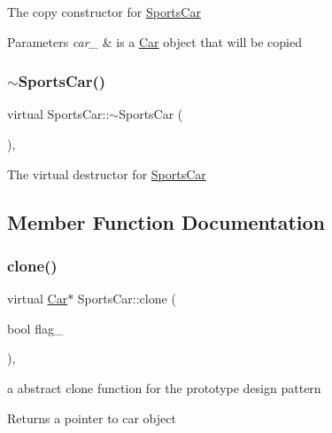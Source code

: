 The copy constructor for \mbox{\hyperlink{class_sports_car}{Sports\+Car}} 
\begin{DoxyParams}{Parameters}
{\em car\+\_\+} & is a \mbox{\hyperlink{class_car}{Car}} object that will be copied \\
\hline
\end{DoxyParams}
\mbox{\label{class_sports_car_a556357475654f0c32c3b28cb436cb379}} 
\subsubsection{\texorpdfstring{$\sim$\+Sports\+Car()}{~SportsCar()}}
{\footnotesize\ttfamily virtual Sports\+Car\+::$\sim$\+Sports\+Car (\begin{DoxyParamCaption}{ }\end{DoxyParamCaption})\hspace{0.3cm}{\ttfamily [inline]}, {\ttfamily [virtual]}}

The virtual destructor for \mbox{\hyperlink{class_sports_car}{Sports\+Car}} 

\subsection{Member Function Documentation}
\mbox{\label{class_sports_car_a4daa739baaee9d9d5ad33f4766ec43ec}} 
\subsubsection{\texorpdfstring{clone()}{clone()}}
{\footnotesize\ttfamily virtual \mbox{\hyperlink{class_car}{Car}}$\ast$ Sports\+Car\+::clone (\begin{DoxyParamCaption}\item[{bool}]{flag\+\_\+ }\end{DoxyParamCaption})\hspace{0.3cm}{\ttfamily [inline]}, {\ttfamily [virtual]}}

a abstract clone function for the prototype design pattern \begin{DoxyReturn}{Returns}
a pointer to car object 
\end{DoxyReturn}


